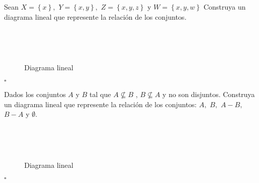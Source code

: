 \begin{ejemplo}

Sean $X=\left\{ x\right\} ,$ $Y=\left\{ x,y\right\} ,$ $Z=\left\{ x,y,z\right\} $
y $W=\left\{ x,y,w\right\} $ Construya un diagrama lineal que represente
la relación de los conjuntos.

\end{ejemplo}

\solu \\
\begin{figure}[H]
\centering 
{}\\[-5pt]
\caption{Diagrama lineal}
\label{diagl2}
\end{figure}
\hfill $\square$

\begin{ejemplo}

Dados los conjuntos $A$ y $B$ tal que $A\nsubseteq B$ , $B\nsubseteq A$
y no son disjuntos. Construya un diagrama lineal que represente la
relación de los conjuntos: $A,$ $B,$ $A-B,$ $B-A$ y $\emptyset.$

\solu \\
\begin{figure}[H]
\centering 
{}\\[-5pt]
\caption{Diagrama lineal}
\label{diagl2}
\end{figure}
\hfill $\square$

\end{ejemplo}

